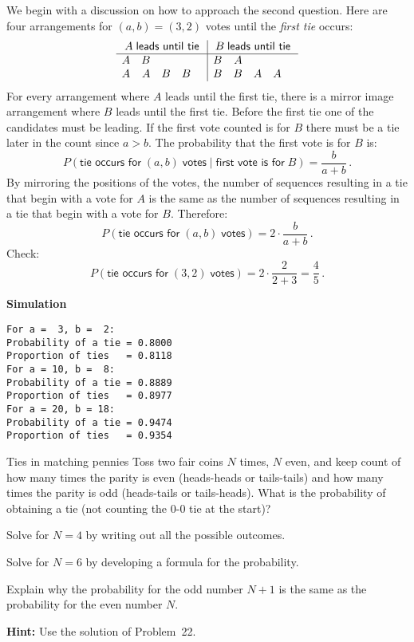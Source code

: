 We begin with a discussion on how to approach the second question. Here are four arrangements for $(a,b)=(3,2)$ votes until the \emph{first tie} occurs:
\[
\begin{array}{rrrrr|rrrrr}
\multicolumn{5}{c|}{A \;\textsf{leads until tie}} &
\multicolumn{5}{c}{B \;\textsf{leads until tie}}\\\hline
A & B &&& &B & A & & &\\
A & A & B & B && B & B & A & A&\\
\end{array}
\]
For every arrangement where $A$ leads until the first tie, there is a mirror image arrangement where $B$ leads until the first tie. Before the first tie one of the candidates must be leading. If the first vote counted is for $B$ there must be a tie later in the count since $a>b$. The probability that the first vote is for $B$ is:
\[
P(\textsf{tie occurs for}\;(a,b)\;\textsf{votes} \;|\; \textsf{first vote is for}\;B)=\frac{b}{a+b}\,.
\]
By mirroring the positions of the votes, the number of sequences resulting in a tie that begin with a vote for $A$ is the same as the number of sequences resulting in a tie that begin with a vote for $B$. Therefore:
\[
P(\textsf{tie occurs for}\;(a,b)\;\textsf{votes})=2\cdot\frac{b}{a+b}\,.
\]
Check:
\[
P(\textsf{tie occurs for}\;(3,2)\;\textsf{votes})=2\cdot\frac{2}{2+3}=\frac{4}{5}\,.
\]

\newpage

\textbf{Simulation}
\begin{verbatim}
For a =  3, b =  2:
Probability of a tie = 0.8000
Proportion of ties   = 0.8118
For a = 10, b =  8:
Probability of a tie = 0.8889
Proportion of ties   = 0.8977
For a = 20, b = 18:
Probability of a tie = 0.9474
Proportion of ties   = 0.9354
\end{verbatim}



\begin{prob}{Ties in matching pennies}
Toss two fair coins $N$ times, $N$ even, and keep count of how many times the parity is even (heads-heads or tails-tails) and how many times the parity is odd (heads-tails or tails-heads). What is the probability of obtaining a tie (not counting the $0$-$0$ tie at the start)?

 Solve for $N=4$ by writing out all the possible outcomes.

 Solve for $N=6$ by developing a formula for the probability.


 Explain why the probability for the odd number $N+1$ is the same as the probability for the even number $N$.

\textbf{Hint:} Use the solution of Problem~22.
\end{prob}

